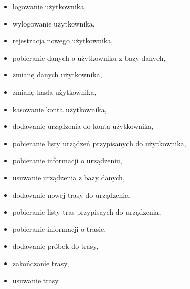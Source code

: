 \begin{itemize}
\item logowanie użytkownika,
\item wylogowanie użytkownika,
\item rejestracja nowego użytkownika,
\item pobieranie danych o użytkowniku z bazy danych,
\item zmianę danych użytkownika,
\item zmianę hasła użytkownika,
\item kasowanie konta użytkownika,
\item dodawanie urządzenia do konta użytkownika,
\item pobieranie listy urządzeń przypisanych do użytkownika,
\item pobieranie informacji o urządzeniu,
\item usuwanie urządzenia z bazy danych,
\item dodawanie nowej trasy do urządzenia,
\item pobieranie listy tras przypisaych do urządzenia,
\item pobieranie informacji o trasie,
\item dodawanie próbek do trasy,
\item zakończanie trasy,
\item usuwanie trasy.
\end{itemize}